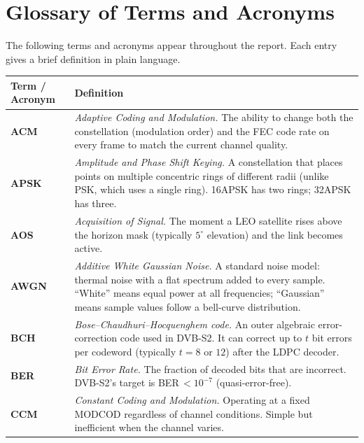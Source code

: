 \documentclass[12pt,a4paper]{report}
\begin{document}
\chapter{Glossary of Terms and Acronyms}

\noindent
The following terms and acronyms appear throughout the report.  Each entry
gives a brief definition in plain language.

\begin{longtable}{p{3.2cm}p{10.5cm}}
\toprule
\textbf{Term / Acronym} & \textbf{Definition} \\
\midrule
\endhead
\bottomrule
\endfoot

\textbf{ACM} & \textit{Adaptive Coding and Modulation.}  The ability to
    change both the constellation (modulation order) and the FEC code rate
    on every frame to match the current channel quality. \\[4pt]

\textbf{APSK} & \textit{Amplitude and Phase Shift Keying.}  A constellation
    that places points on multiple concentric rings of different radii (unlike
    PSK, which uses a single ring).  16APSK has two rings; 32APSK has three. \\[4pt]

\textbf{AOS} & \textit{Acquisition of Signal.}  The moment a LEO satellite
    rises above the horizon mask (typically $5^\circ$ elevation) and the link
    becomes active. \\[4pt]

\textbf{AWGN} & \textit{Additive White Gaussian Noise.}  A standard noise
    model: thermal noise with a flat spectrum added to every sample.  ``White''
    means equal power at all frequencies; ``Gaussian'' means sample values follow
    a bell-curve distribution. \\[4pt]

\textbf{BCH} & \textit{Bose--Chaudhuri--Hocquenghem code.}  An outer algebraic
    error-correction code used in DVB-S2.  It can correct up to $t$ bit errors
    per codeword (typically $t = 8$ or $12$) after the LDPC decoder. \\[4pt]

\textbf{BER} & \textit{Bit Error Rate.}  The fraction of decoded bits that are
    incorrect.  DVB-S2's target is BER\,$< 10^{-7}$ (quasi-error-free). \\[4pt]

\textbf{CCM} & \textit{Constant Coding and Modulation.}  Operating at a fixed
    MODCOD regardless of channel conditions.  Simple but inefficient when the
    channel varies. \\[4pt]


\end{longtable}
\end{document}
